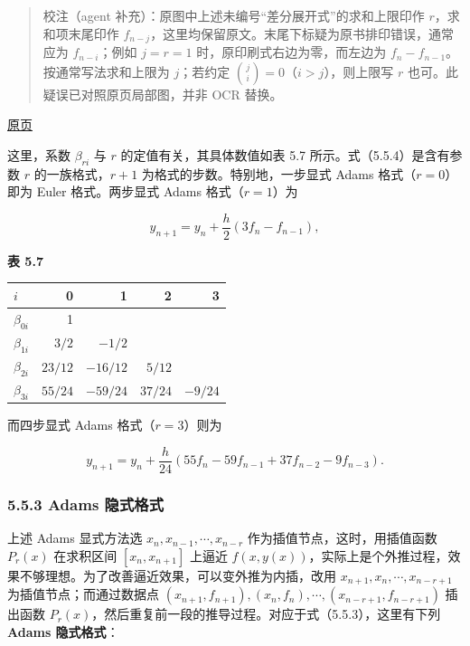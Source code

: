 \documentclass[
  10pt,
  fontset=fandol]{ctexart}
\newcounter{none} %
\begin{document}
\begin{quote}
校注（agent 补充）：原图中上述未编号``差分展开式''的求和上限印作 \(r\)，求和项末尾印作 \(f_{n-j}\)，这里均保留原文。末尾下标疑为原书排印错误，通常应为 \(f_{n-i}\)；例如 \(j=r=1\) 时，原印刷式右边为零，而左边为 \(f_n-f_{n-1}\)。按通常写法求和上限为 \(j\)；若约定 \(\binom ji=0\)（\(i>j\)），则上限写 \(r\) 也可。此疑误已对照原页局部图，并非 OCR 替换。
\end{quote}

\href{../../source-images/pdf-139.jpeg}{原页}

这里，系数 \(\beta_{ri}\) 与 \(r\) 的定值有关，其具体数值如表 5.7 所示。式（5.5.4）是含有参数 \(r\) 的一族格式，\(r+1\) 为格式的步数。特别地，一步显式 Adams 格式（\(r=0\)）即为 Euler 格式。两步显式 Adams 格式（\(r=1\)）为

\[
y_{n+1}=y_n+\frac h2(3f_n-f_{n-1}),
\tag{5.5.5}
\]

\textbf{表 5.7}

{\def\LTcaptype{none} %
\begin{longtable}[]{@{}lrrrr@{}}
\toprule\noalign{}
\(i\) & 0 & 1 & 2 & 3 \\
\midrule\noalign{}
\endhead
\bottomrule\noalign{}
\endlastfoot
\(\beta_{0i}\) & 1 & & & \\
\(\beta_{1i}\) & \(3/2\) & \(-1/2\) & & \\
\(\beta_{2i}\) & \(23/12\) & \(-16/12\) & \(5/12\) & \\
\(\beta_{3i}\) & \(55/24\) & \(-59/24\) & \(37/24\) & \(-9/24\) \\
\end{longtable}
}

而四步显式 Adams 格式（\(r=3\)）则为

\[
y_{n+1}=y_n+\frac h{24}(55f_n-59f_{n-1}+37f_{n-2}-9f_{n-3}).
\tag{5.5.6}
\]

\subsubsection{5.5.3 Adams 隐式格式}\label{adams-ux9690ux5f0fux683cux5f0f}

上述 Adams 显式方法选 \(x_n,x_{n-1},\cdots,x_{n-r}\) 作为插值节点，这时，用插值函数 \(P_r(x)\) 在求积区间 \([x_n,x_{n+1}]\) 上逼近 \(f(x,y(x))\)，实际上是个外推过程，效果不够理想。为了改善逼近效果，可以变外推为内插，改用 \(x_{n+1},x_n,\cdots,x_{n-r+1}\) 为插值节点；而通过数据点 \((x_{n+1},\allowbreak f_{n+1}),\allowbreak (x_n,\allowbreak f_n),\allowbreak \cdots,\allowbreak (x_{n-r+1},\allowbreak f_{n-r+1})\) 插出函数 \(P_r(x)\)，然后重复前一段的推导过程。对应于式（5.5.3），这里有下列 \textbf{Adams 隐式格式}：
\end{document}
